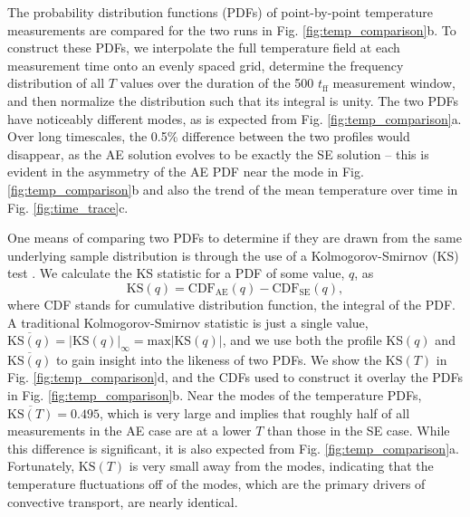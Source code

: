 \documentclass[aps, pre, onecolumn, nofootinbib, notitlepage, groupedaddress, amsfonts, amssymb, amsmath, longbibliography]{revtex4-1}
\newcommand{\KS}[1]{\ensuremath{\text{KS}(#1)}}
\newcommand{\KSstat}[1]{\ensuremath{\overline{\text{KS}(#1)}}}
\begin{document}
The probability distribution functions (PDFs)
of point-by-point temperature measurements are compared for the two runs
in Fig. \ref{fig:temp_comparison}b. To construct these PDFs, 
we interpolate the full temperature field
at each measurement time onto an evenly spaced grid, determine the
frequency distribution of all $T$ values over the duration of the 500 $t_{\text{ff}}$
measurement window, and then normalize the
distribution such that its integral is unity.  The two PDFs have noticeably
different modes, as is expected from Fig. \ref{fig:temp_comparison}a. 
Over long timescales, the 0.5\% difference between the two profiles would
disappear, as the AE solution evolves to be exactly the SE solution -- this
is evident in the asymmetry of the AE PDF near the mode
in Fig. \ref{fig:temp_comparison}b and also
the trend of the mean temperature over time in Fig. \ref{fig:time_trace}c.

One means of comparing two
PDFs to determine if they are drawn from the same underlying
sample distribution is through the use of a Kolmogorov-Smirnov (KS) test \cite{wall&jenkins2012}.
We calculate the KS statistic for a PDF of some value, $q$, as
\begin{equation}
\KS{q} = \text{CDF}_{\text{AE}}(q) - \text{CDF}_{\text{SE}}(q),
\label{eqn:ks_profile}
\end{equation}
where CDF stands for cumulative distribution function, the integral of the PDF.
A traditional Kolmogorov-Smirnov statistic is just a single value,
$\KSstat{q} = |\KS{q}|_\infty =
\text{max} |\KS{q}|$, and we use both the profile KS$(q)$ and
$\KSstat{q}$ to gain insight into the likeness of two PDFs. 
We show the $\KS{T}$ in Fig. \ref{fig:temp_comparison}d, and the
CDFs used to construct it overlay the PDFs in Fig. \ref{fig:temp_comparison}b.
Near the modes of the temperature PDFs, $\KSstat{T} = 0.495$, 
which is very large and implies that roughly half of all
measurements in the AE case are at a lower $T$ than those in the SE case.
While this difference is significant, it is also expected from Fig. \ref{fig:temp_comparison}a.
Fortunately, $\KS{T}$ is very small away from the modes, 
indicating that the temperature fluctuations off of the modes, which are the primary
drivers of convective transport, are nearly identical.
\end{document}
